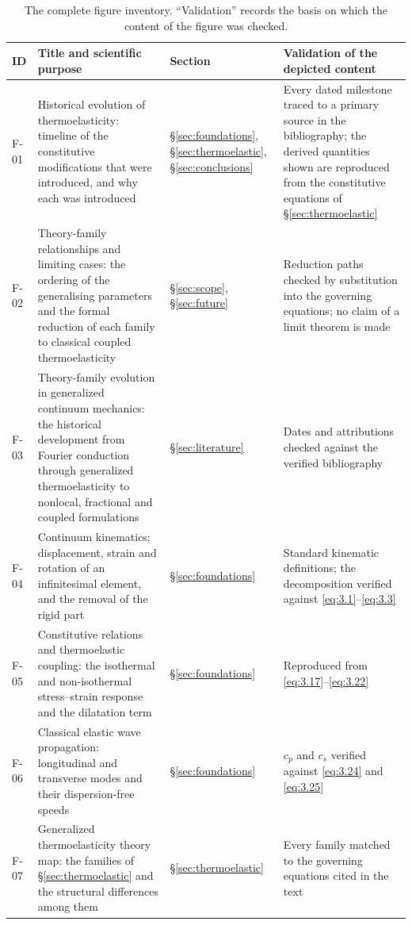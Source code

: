 \begin{table}[h]
\centering
\small
\caption{The complete figure inventory. ``Validation'' records the basis on which the content of the figure was checked.}
\label{tab:appD-figures}
\begin{tabularx}{\textwidth}{@{}lXlX@{}}
\toprule
\textbf{ID} & \textbf{Title and scientific purpose} & \textbf{Section} & \textbf{Validation of the depicted content} \\
\midrule
F-01 & Historical evolution of thermoelasticity: timeline of the constitutive modifications that were introduced, and why each was introduced & \S\ref{sec:foundations}, \S\ref{sec:thermoelastic}, \S\ref{sec:conclusions} & Every dated milestone traced to a primary source in the bibliography; the derived quantities shown are reproduced from the constitutive equations of \S\ref{sec:thermoelastic} \\
F-02 & Theory-family relationships and limiting cases: the ordering of the generalising parameters and the formal reduction of each family to classical coupled thermoelasticity & \S\ref{sec:scope}, \S\ref{sec:future} & Reduction paths checked by substitution into the governing equations; no claim of a limit theorem is made \\
F-03 & Theory-family evolution in generalized continuum mechanics: the historical development from Fourier conduction through generalized thermoelasticity to nonlocal, fractional and coupled formulations & \S\ref{sec:literature} & Dates and attributions checked against the verified bibliography \\
F-04 & Continuum kinematics: displacement, strain and rotation of an infinitesimal element, and the removal of the rigid part & \S\ref{sec:foundations} & Standard kinematic definitions; the decomposition verified against \eqref{eq:3.1}--\eqref{eq:3.3} \\
F-05 & Constitutive relations and thermoelastic coupling: the isothermal and non-isothermal stress--strain response and the dilatation term & \S\ref{sec:foundations} & Reproduced from \eqref{eq:3.17}--\eqref{eq:3.22} \\
F-06 & Classical elastic wave propagation: longitudinal and transverse modes and their dispersion-free speeds & \S\ref{sec:foundations} & $c_p$ and $c_s$ verified against \eqref{eq:3.24} and \eqref{eq:3.25} \\
F-07 & Generalized thermoelasticity theory map: the families of \S\ref{sec:thermoelastic} and the structural differences among them & \S\ref{sec:thermoelastic} & Every family matched to the governing equations cited in the text \\

\end{tabularx}
\end{table}
